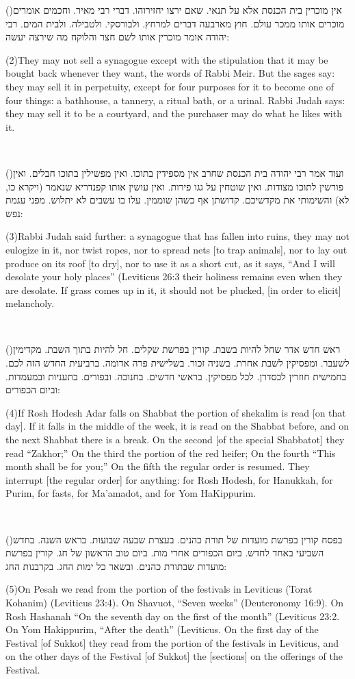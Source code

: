 \documentclass[12pt, openany]{book}
\newcommand{\sethebfont}{
\fontsize{10.5pt}{13.1pt} \selectfont
}
\newcommand{\LTRmark}{‎}
\newcommand{\hebeng}[2]{
	{\sethebfont #1}
	
	{\beginL\englishfont\sethebfont{\raggedright #2 \hfill} \LTRmark\endL}
	
	\vspace{\baselineskip}
}
\newcommand{\vsnum}[1]{(\hebrewnumeral{#1})\space}
\newcommand{\vsnumeng}[1]{(#1)\space}
\begin{document}
\hebeng{\vsnum{2}אין מוכרין בית הכנסת אלא על תנאי. שאם ירצו יחזירוהו. דברי רבי מאיר. וחכמים אומרים מוכרים אותו ממכר עולם. חוץ מארבעה דברים למרחץ. ולבורסקי. ולטבילה. ולבית המים. רבי יהודה אומר מוכרין אותו לשם חצר והלוקח מה שירצה יעשה: }{\vsnumeng{2}They may not sell a synagogue except with the stipulation that it may be bought back whenever they want, the words of Rabbi Meir. But the sages say: they may sell it in perpetuity, except for four purposes for it to become one of four things: a bathhouse, a tannery, a ritual bath, or a urinal. Rabbi Judah says: they may sell it to be a courtyard, and the purchaser may do what he likes with it.}%

\hebeng{\vsnum{3}ועוד אמר רבי יהודה בית הכנסת שחרב אין מספידין בתוכו. ואין מפשילין בתוכו חבלים. ואין פורשין לתוכו מצודות. ואין שוטחין על גגו פירות. ואין עושין אותו קפנדריא שנאמר (ויקרא כו, לא) והשימותי את מקדשיכם. קדושתן אף כשהן שוממין. עלו בו עשבים לא יתלוש. מפני עגמת נפש: }{\vsnumeng{3}Rabbi Judah said further: a synagogue that has fallen into ruins, they may not eulogize in it, nor twist ropes, nor to spread nets {[to trap animals]}, nor to lay out produce on its roof {[to dry]}, nor to use it as a short cut, as it says, “And I will desolate your holy places” (Leviticus 26:3 their holiness remains even when they are desolate. If grass comes up in it, it should not be plucked, {[in order to elicit]} melancholy.}%

\hebeng{\vsnum{4}ראש חדש אדר שחל להיות בשבת. קורין בפרשת שקלים. חל להיות בתוך השבת. מקדימין לשעבר. ומפסיקין לשבת אחרת. בשניה זכור. בשלישית פרה אדומה. ברביעית החדש הזה לכם. בחמישית חוזרין לכסדרן. לכל מפסיקין. בראשי חדשים. בחנוכה. ובפורים. בתעניות ובמעמדות. וביום הכפורים: }{\vsnumeng{4}If Rosh Hodesh Adar falls on Shabbat the portion of shekalim is read {[on that day]}. If it falls in the middle of the week, it is read on the Shabbat before, and on the next Shabbat there is a break. On the second {[of the special Shabbatot]} they read “Zakhor;” On the third the portion of the red heifer; On the fourth “This month shall be for you;” On the fifth the regular order is resumed. They interrupt {[the regular order]} for anything: for Rosh Hodesh, for Hanukkah, for Purim, for fasts, for Ma’amadot, and for Yom HaKippurim.}%

\hebeng{\vsnum{5}בפסח קורין בפרשת מועדות של תורת כהנים. בעצרת שבעה שבועות. בראש השנה. בחדש השביעי באחד לחדש. ביום הכפורים אחרי מות. ביום טוב הראשון של חג. קורין בפרשת מועדות שבתורת כהנים. ובשאר כל ימות החג. בקרבנות החג: }{\vsnumeng{5}On Pesah we read from the portion of the festivals in Leviticus (Torat Kohanim) (Leviticus 23:4). On Shavuot, “Seven weeks” (Deuteronomy 16:9). On Rosh Hashanah “On the seventh day on the first of the month” (Leviticus 23:2. On Yom Hakippurim, “After the death” (Leviticus. On the first day of the Festival {[of Sukkot]} they read from the portion of the festivals in Leviticus, and on the other days of the Festival {[of Sukkot]} the {[sections]} on the offerings of the Festival.}%
\end{document}
